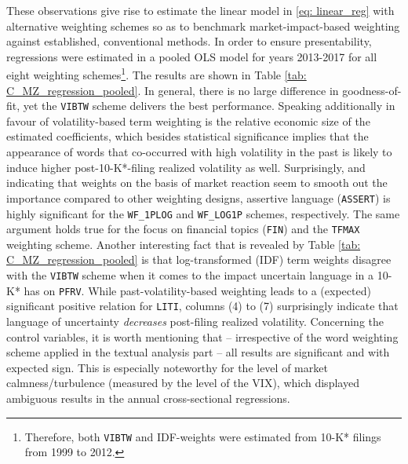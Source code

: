 These observations give rise to estimate the linear model in \eqref{eq: linear_reg} with alternative weighting schemes so as to benchmark market-impact-based weighting against established, conventional methods. In order to ensure presentability, regressions were estimated in a pooled OLS model for years 2013-2017 for all eight weighting schemes\footnote{Therefore, both \texttt{VIBTW} and IDF-weights were estimated from 10-K* filings from 1999 to 2012.}. The results are shown in Table \ref{tab: C_MZ_regression_pooled}. In general, there is no large difference in goodness-of-fit, yet the \texttt{VIBTW} scheme delivers the best performance. Speaking additionally in favour of volatility-based term weighting is the relative economic size of the estimated coefficients, which besides statistical significance implies that the appearance of words that co-occurred with high volatility in the past is likely to induce higher post-10-K*-filing realized volatility as well. Surprisingly, and indicating that weights on the basis of market reaction seem to smooth out the importance compared to other weighting designs, assertive language (\texttt{ASSERT}) is highly significant for the \texttt{WF\_1PLOG} and \texttt{WF\_LOG1P}  schemes, respectively. The same argument holds true for the focus on financial topics (\texttt{FIN}) and the \texttt{TFMAX} weighting scheme. Another interesting fact that is revealed by Table \ref{tab: C_MZ_regression_pooled} is that log-transformed (IDF) term weights disagree with the \texttt{VIBTW} scheme when it comes to the impact uncertain language in a 10-K* has on \texttt{PFRV}. While past-volatility-based weighting leads to a (expected) significant positive relation for \texttt{LITI}, columns (4) to (7) surprisingly indicate that language of uncertainty \textit{decreases} post-filing realized volatility. Concerning the control variables, it is worth mentioning that -- irrespective of the word weighting scheme applied in the textual analysis part -- all results are significant and with expected sign. This is especially noteworthy for the level of market calmness/turbulence (measured by the level of the VIX), which displayed ambiguous results in the annual cross-sectional regressions. 


